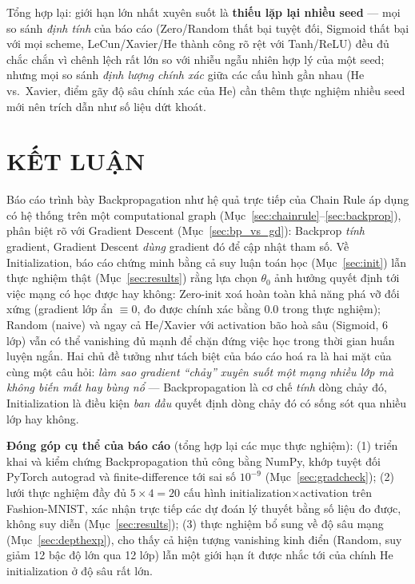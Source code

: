 \documentclass[12pt,a4paper]{report}
\begin{document}
Tổng hợp lại: giới hạn lớn nhất xuyên suốt là \textbf{thiếu lặp lại nhiều
seed} --- mọi so sánh \emph{định tính} của báo cáo (Zero/Random thất bại
tuyệt đối, Sigmoid thất bại với mọi scheme, LeCun/Xavier/He thành công rõ
rệt với Tanh/ReLU) đều đủ chắc chắn vì chênh lệch rất lớn so với nhiễu
ngẫu nhiên hợp lý của một seed; nhưng mọi so sánh \emph{định lượng chính
xác} giữa các cấu hình gần nhau (He vs.\ Xavier, điểm gãy độ sâu chính
xác của He) cần thêm thực nghiệm nhiều seed mới nên trích dẫn như số liệu
dứt khoát.

\chapter*{KẾT LUẬN}

Báo cáo trình bày Backpropagation như hệ quả trực tiếp của Chain Rule áp
dụng có hệ thống trên một computational graph (Mục~\ref{sec:chainrule}--\ref{sec:backprop}),
phân biệt rõ với Gradient Descent (Mục~\ref{sec:bp_vs_gd}): Backprop
\emph{tính} gradient, Gradient Descent \emph{dùng} gradient đó để cập nhật
tham số. Về Initialization, báo cáo chứng minh bằng cả suy luận toán học
(Mục~\ref{sec:init}) lẫn thực nghiệm thật (Mục~\ref{sec:results}) rằng lựa
chọn $\theta_0$ ảnh hưởng quyết định tới việc mạng có học được hay không:
Zero-init xoá hoàn toàn khả năng phá vỡ đối xứng (gradient lớp ẩn $\equiv0$,
đo được chính xác bằng $0.0$ trong thực nghiệm); Random (naive) và ngay
cả He/Xavier với activation bão hoà sâu (Sigmoid, 6 lớp) vẫn có thể
vanishing đủ mạnh để chặn đứng việc học trong thời gian huấn luyện ngắn.
Hai chủ đề tưởng như tách biệt của báo cáo hoá ra là hai mặt của cùng một
câu hỏi: \emph{làm sao gradient ``chảy'' xuyên suốt một mạng nhiều lớp mà
không biến mất hay bùng nổ} --- Backpropagation là cơ chế \emph{tính}
dòng chảy đó, Initialization là điều kiện \emph{ban đầu} quyết định dòng
chảy đó có sống sót qua nhiều lớp hay không.

\textbf{Đóng góp cụ thể của báo cáo} (tổng hợp lại các mục thực nghiệm):
(1) triển khai và kiểm chứng Backpropagation thủ công bằng NumPy, khớp
tuyệt đối PyTorch autograd và finite-difference tới sai số $10^{-9}$
(Mục~\ref{sec:gradcheck}); (2) lưới thực nghiệm đầy đủ $5\times4=20$ cấu
hình initialization$\times$activation trên Fashion-MNIST, xác nhận trực
tiếp các dự đoán lý thuyết bằng số liệu đo được, không suy diễn
(Mục~\ref{sec:results}); (3) thực nghiệm bổ sung về độ sâu mạng
(Mục~\ref{sec:depthexp}), cho thấy cả hiện tượng vanishing kinh điển
(Random, suy giảm 12 bậc độ lớn qua 12 lớp) lẫn một giới hạn ít được nhắc
tới của chính He initialization ở độ sâu rất lớn.
\end{document}
